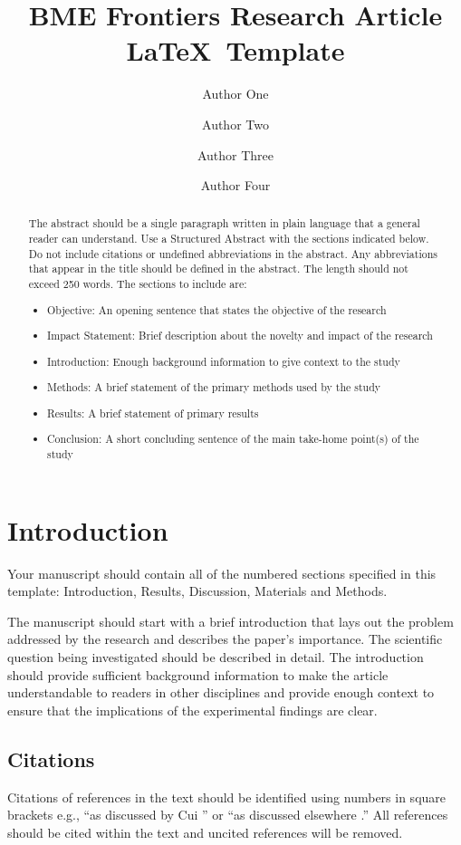 \documentclass{article}
\title{BME Frontiers Research Article \LaTeX\ Template}
\author[1*$\dag$]{Author One}
\author[2$\dag$]{Author Two}
\author[2]{Author Three}
\author[1,2]{Author Four}
\affil[1]{Department of Physics, A University, City, Country.}
\affil[2]{Department of Astronomy, B University, City, Country.}
\affil[*]{Corresponding author. Email: email@email.com}
\affil[$\dag$]{These authors contributed equally to this work.}
\date{}
\begin{document}
\maketitle

\begin{abstract}
The abstract should be a single paragraph written in plain language that a general reader can understand. Use a Structured Abstract with the sections indicated below. Do not include citations or undefined abbreviations in the abstract. Any abbreviations that appear in the title should be defined in the abstract. The length should not exceed 250 words. The sections to include are: 
\begin{itemize}
    \item Objective: An opening sentence that states the objective of the research
    \item Impact Statement: Brief description about the novelty and impact of the research
    \item Introduction: Enough background information to give context to the study
    \item Methods: A brief statement of the primary methods used by the study
    \item Results: A brief statement of primary results
    \item Conclusion: A short concluding sentence of the main take-home point(s) of the study
\end{itemize} 
\end{abstract}


\section{Introduction}
Your manuscript should contain all of the numbered sections specified in this template: Introduction, Results, Discussion, Materials and Methods.

The manuscript should start with a brief introduction that lays out the problem addressed by the research and describes the paper’s importance. The scientific question being investigated should be described in detail. The introduction should provide sufficient background information to make the article understandable to readers in other disciplines and provide enough context to ensure that the implications of the experimental findings are clear. 

\subsection*{Citations}
Citations of references in the text should be identified using numbers in square brackets e.g., ``as discussed by Cui \cite{Cui1}'' or ``as discussed elsewhere \cite{Cui1,Ninomiya1,Li1,Wang1,Yang1}.'' All references should be cited within the text and uncited references will be removed. 
\end{document}
